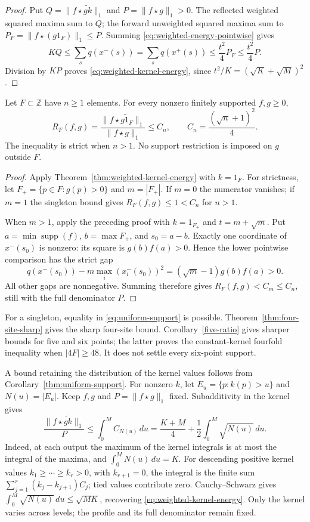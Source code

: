 \begin{proof}
Put $Q=\|f\star\widetilde{gk}\|_1$ and
$P=\|f\star g\|_1>0$. The reflected weighted squared maxima sum to $Q$;
the forward unweighted squared maxima sum to
$P_F=\|f\star(g1_F)\|_1\le P$. Summing
\eqref{eq:weighted-energy-pointwise} gives
\[
 KQ\le\sum_s q(x^-(s))=\sum_s q(x^+(s))
       \le\frac{t^2}{4}P_F\le\frac{t^2}{4}P.
\]
Division by $KP$ proves \eqref{eq:weighted-kernel-energy}, since
$t^2/K=(\sqrt K+\sqrt M)^2$.
\end{proof}

\begin{corollary}\label{thm:uniform-support}
Let $F\subset\mathbb Z$ have $n\ge1$ elements. For every nonzero finitely
supported $f,g\ge0$,
\begin{equation}\label{eq:uniform-support}
 R_F(f,g)=\frac{\|f\star\widetilde{g1_F}\|_1}{\|f\star g\|_1}
 \le C_n,\qquad C_n=\frac{(\sqrt n+1)^2}{4}.
\end{equation}
The inequality is strict when $n>1$. No support restriction is imposed
on $g$ outside $F$.
\end{corollary}
\begin{proof}
Apply Theorem~\ref{thm:weighted-kernel-energy} with $k=1_F$.
For strictness, let $F_+=\{p\in F:g(p)>0\}$ and $m=|F_+|$.
If $m=0$ the numerator vanishes; if $m=1$ the singleton bound gives
$R_F(f,g)\le1<C_n$ for $n>1$.

When $m>1$, apply the preceding proof with $k=1_{F_+}$ and
$t=m+\sqrt m$. Put $a=\min\operatorname{supp}(f)$,
$b=\max F_+$, and $s_0=a-b$. Exactly one coordinate of $x^-(s_0)$
is nonzero: its square is $g(b)f(a)>0$. Hence the lower pointwise
comparison has the strict gap
\[
 q(x^-(s_0))-m\max_i(x_i^-(s_0))^2
       =(\sqrt m-1)g(b)f(a)>0.
\]
All other gaps are nonnegative. Summing therefore gives
$R_F(f,g)<C_m\le C_n$, still with the full denominator $P$.
\end{proof}

For a singleton, equality in \eqref{eq:uniform-support} is possible.
Theorem~\ref{thm:four-site-sharp} gives the sharp four-site bound.
Corollary~\ref{five-ratio} gives sharper bounds for five and six points;
the latter proves the constant-kernel fourfold inequality when
$|4F|\ge48$. It does not settle every six-point support.

\begin{remark}\label{rem:kernel-levels}
A bound retaining the distribution of the kernel values follows from
Corollary~\ref{thm:uniform-support}. For nonzero $k$, let
$E_u=\{p:k(p)>u\}$ and $N(u)=|E_u|$. Keep $f,g$ and
$P=\|f\star g\|_1$ fixed. Subadditivity in the kernel gives
\[
 \frac{\|f\star\widetilde{gk}\|_1}{P}
 \le\int_0^M C_{N(u)}\,du
 =\frac{K+M}{4}+\frac12\int_0^M\sqrt{N(u)}\,du.
\]
Indeed, at each output the maximum of the kernel integrals is at most
the integral of the maxima, and $\int_0^M N(u)\,du=K$.
For descending positive kernel values $k_1\ge\cdots\ge k_r>0$,
with $k_{r+1}=0$, the integral is the finite sum
$\sum_{j=1}^r(k_j-k_{j+1})C_j$; tied values contribute zero.
Cauchy--Schwarz gives
$\int_0^M\sqrt{N(u)}\,du\le\sqrt{MK}$, recovering
\eqref{eq:weighted-kernel-energy}. Only the kernel varies across levels;
the profile and its full denominator remain fixed.
\end{remark}

